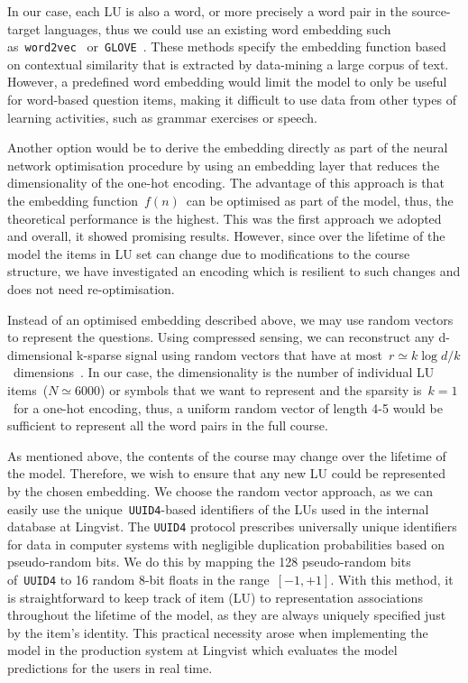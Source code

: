 In our case, each LU is also a word, or more precisely a word pair in the source-target languages, thus we could use an existing word embedding such
as~\texttt{word2vec}~\cite{mikolov2013efficient} or~\texttt{GLOVE}~\cite{pennington2014glove}. These methods specify the embedding function based on contextual similarity that is extracted by data-mining a large corpus of text. However, a predefined word embedding would limit the model to only be useful for word-based question items, making it difficult to use data from other types of learning activities, such as grammar exercises or speech.

Another option would be to derive the embedding directly as part of the neural network optimisation procedure by using an embedding layer that reduces the dimensionality of the one-hot encoding. The advantage of this approach is that the embedding function~$f(n)$~can be optimised as part of the model, thus, the theoretical performance is the highest. This was the first approach we adopted and overall, it showed promising results. However, since over the lifetime of the model the items in LU set can change due to modifications to the course structure, we have investigated an encoding which is resilient to such changes and does not need re-optimisation.

Instead of an optimised embedding described above, we may use random vectors to represent the questions. Using compressed sensing, we can reconstruct any d-dimensional k-sparse signal using random vectors that have at most~$r \simeq k\log d/k$~dimensions~\cite{baraniuk2007compressive}. In our case, the dimensionality is the number of individual LU items~($N \simeq 6000$) or symbols that we want to represent and the sparsity is~$k=1$~for a one-hot encoding, thus, a uniform random vector of length 4-5 would be sufficient to represent all the word pairs in the full course.

As mentioned above, the contents of the course may change over the lifetime of the model. Therefore, we wish to ensure that any new LU could be represented by the chosen embedding. We choose the random vector approach, as we can easily use the unique~\texttt{UUID4}-based identifiers of the LUs used in the internal database at Lingvist. The \texttt{UUID4} protocol prescribes universally unique identifiers for data in computer systems with negligible duplication probabilities based on pseudo-random bits. We do this by mapping the 128 pseudo-random bits of~\texttt{UUID4} to 16 random 8-bit floats in the range~$[-1, +1]$. With this method, it is straightforward to keep track of item (LU) to representation associations throughout the lifetime of the model, as they are always uniquely specified just by the item's identity. This practical necessity arose when implementing the model in the production system at Lingvist which evaluates the model predictions for the users in real time. 

